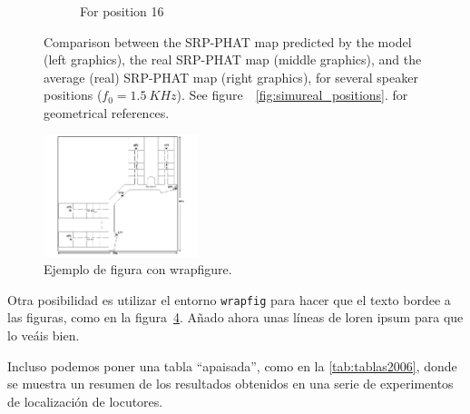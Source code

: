 \documentclass[spanish,openright]{book}
\newcommand{\verticalSpacingSRPMaps}{-0.3cm}
\begin{document}
\begin{figure}
\begin{subfigure}[t]{0.47\textwidth}
\begin{minipage}[t]{\textwidth}
\begin{subfigure}[t]{0.3\textwidth}
\label{fig:SRP_Fo1500_mean_pos16}
\end{subfigure}
\vspace{\verticalSpacingSRPMaps}
\caption{\centering For position 16}
\vspace{0.25cm}
\end{minipage}
\end{subfigure}
\caption{Comparison between the SRP-PHAT map predicted by the model
(left graphics),
the real SRP-PHAT map (middle graphics), and the average (real)
SRP-PHAT map (right graphics), for
several speaker positions ($f_0=1.5~KHz$). See
figure~~\ref{fig:simureal_positions}.
for geometrical references.}
\label{fig:SRPvsPatternSelected}
\end{figure}

\begin{figure}
\vspace{-20pt}
\begin{center}
\includegraphics[width=0.4\textwidth]{Figure1}
\caption{Ejemplo de figura con wrapfigure.}
\label{fig:wrapfigure1}
\end{center}
\vspace{-20pt}
\vspace{1pt}
\end{figure}

Otra posibilidad es utilizar el entorno \texttt{wrapfig} para hacer que
el texto bordee a las figuras, como en la
figura~\ref{fig:wrapfigure1}. Añado ahora unas líneas de loren ipsum
para que lo veáis bien. \lipsum[1-1]





Incluso podemos poner una tabla ``apaisada'', como en la
\ref{tab:tablas2006}, donde se muestra un resumen de los resultados
obtenidos en una serie de experimentos de localización de locutores.
\end{document}
